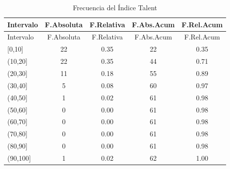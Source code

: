 \documentclass[
]{article}
\begin{document}
\begin{longtable}[]{@{}lcccc@{}}
\caption{Frecuencia del Índice Talent}\tabularnewline
\toprule\noalign{}
Intervalo & F.Absoluta & F.Relativa & F.Abs.Acum & F.Rel.Acum \\
\midrule\noalign{}
\endfirsthead
\toprule\noalign{}
Intervalo & F.Absoluta & F.Relativa & F.Abs.Acum & F.Rel.Acum \\
\midrule\noalign{}
\endhead
\bottomrule\noalign{}
\endlastfoot
{[}0,10{]} & 22 & 0.35 & 22 & 0.35 \\
(10,20{]} & 22 & 0.35 & 44 & 0.71 \\
(20,30{]} & 11 & 0.18 & 55 & 0.89 \\
(30,40{]} & 5 & 0.08 & 60 & 0.97 \\
(40,50{]} & 1 & 0.02 & 61 & 0.98 \\
(50,60{]} & 0 & 0.00 & 61 & 0.98 \\
(60,70{]} & 0 & 0.00 & 61 & 0.98 \\
(70,80{]} & 0 & 0.00 & 61 & 0.98 \\
(80,90{]} & 0 & 0.00 & 61 & 0.98 \\
(90,100{]} & 1 & 0.02 & 62 & 1.00 \\
\end{longtable}
\end{document}
